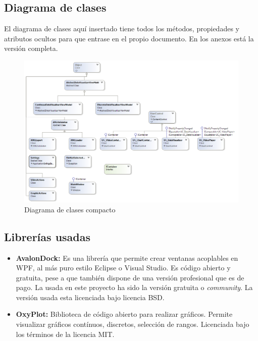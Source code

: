 \subsection{Diagrama de clases}
El diagrama de clases aqu\'i insertado tiene todos los m\'etodos, propiedades y atributos ocultos para que entrase
en el propio documento. En los anexos est\'a la versi\'on completa.

\begin{figure}[h]
\centering
\includegraphics[width=1.2\linewidth]{./Figures/ClassDiagram}
\caption[Diagrama de clases compacto]{Diagrama de clases compacto}
\label{fig:ClassDiagram}
\end{figure}

\subsection{Librer\'{i}as usadas}
\begin{itemize}
    \item \textbf{AvalonDock:} 
    Es una librer\'{i}a que permite crear ventanas acoplables en WPF, al m\'as puro estilo Eclipse o Visual Studio. Es
    c\'{o}digo abierto y gratuita, pese a que tambi\'{e}n dispone de una versi\'{o}n profesional que es de pago. La usada en este proyecto
    ha sido la versi\'{o}n gratuita o \emph{community}. La versi\'{o}n usada esta licenciada bajo licencia BSD.
    \item \textbf{OxyPlot:}
    Biblioteca de c\'odigo abierto para realizar gr\'aficos. Permite visualizar gr\'aficos cont\'inuos, discretos, 
    selecci\'on de rangos. Licenciada bajo los t\'erminos de la licencia MIT.
\end{itemize}

